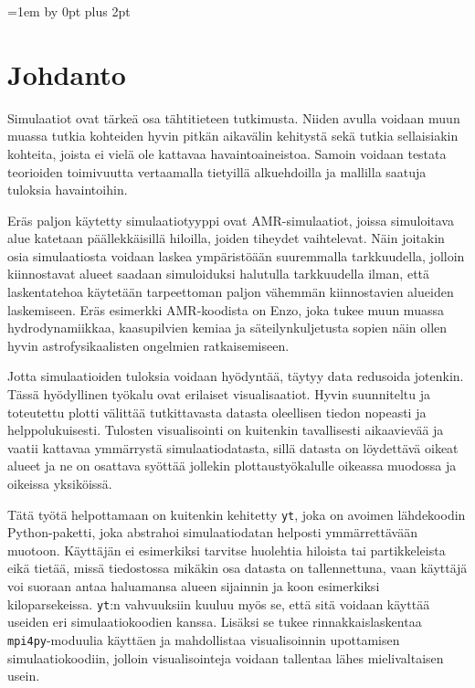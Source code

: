\documentclass[12pt,a4paper]{article}
\newcommand{\yt}{\texttt{yt}}
\begin{document}


\newpage
\tableofcontents
\thispagestyle{empty}
\newpage
\setcounter{page}{1}
\parskip=1em \advance\parskip by 0pt plus 2pt
\pagestyle{fancy}
\cfoot{\thepage}

\section{Johdanto}
Simulaatiot ovat tärkeä osa tähtitieteen tutkimusta. Niiden avulla voidaan muun muassa tutkia kohteiden hyvin pitkän aikavälin kehitystä sekä tutkia sellaisiakin kohteita, joista ei vielä ole kattavaa havaintoaineistoa. Samoin voidaan testata teorioiden toimivuutta vertaamalla tietyillä alkuehdoilla ja mallilla saatuja tuloksia havaintoihin.

Eräs paljon käytetty simulaatiotyyppi ovat AMR-simulaatiot, joissa simuloitava alue katetaan päällekkäisillä hiloilla, joiden tiheydet vaihtelevat. Näin joitakin osia simulaatiosta voidaan laskea ympäristöään suuremmalla tarkkuudella, jolloin kiinnostavat alueet saadaan simuloiduksi halutulla tarkkuudella ilman, että laskentatehoa käytetään tarpeettoman paljon vähemmän kiinnostavien alueiden laskemiseen. Eräs esimerkki AMR-koodista on Enzo, joka tukee muun muassa hydrodynamiikkaa, kaasupilvien kemiaa ja säteilynkuljetusta sopien näin ollen hyvin astrofysikaalisten ongelmien ratkaisemiseen. \cite{enzo}

Jotta simulaatioiden tuloksia voidaan hyödyntää, täytyy data redusoida jotenkin. Tässä hyö\-dyl\-li\-nen työkalu ovat erilaiset visualisaatiot. Hyvin suunniteltu ja toteutettu plotti välittää tutkittavasta datasta oleellisen tiedon nopeasti ja helppolukuisesti. Tulosten visualisointi on kuitenkin tavallisesti aikaavievää ja vaatii kattavaa ymmärrystä simulaatiodatasta, sillä datasta on löydettävä oikeat alueet ja ne on osattava syöttää jollekin plottaustyökalulle oikeassa muodossa ja oikeissa yksiköissä.

Tätä työtä helpottamaan on kuitenkin kehitetty \yt, joka on avoimen lähdekoodin Python-paketti, joka abstrahoi simulaatiodatan helposti ymmärrettävään muotoon. Käyttäjän ei esimerkiksi tarvitse huolehtia hiloista tai partikkeleista eikä tietää, missä tiedostossa mikäkin osa datasta on tallennettuna, vaan käyttäjä voi suoraan antaa haluamansa alueen sijainnin ja koon esimerkiksi kiloparsekeissa. \yt :n vahvuuksiin kuuluu myös se, että sitä voidaan käyttää useiden eri simulaatiokoodien kanssa. Lisäksi se tukee rinnakkaislaskentaa \texttt{mpi4py}-moduulia käyttäen ja mahdollistaa visualisoinnin upottamisen simulaatiokoodiin, jolloin visualisointeja voidaan tallentaa lähes mielivaltaisen usein. \cite{yt}
\end{document}
